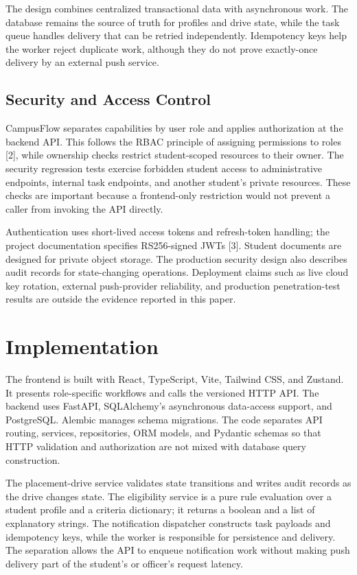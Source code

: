 \documentclass[conference,final]{IEEEtran}
\begin{document}
The design combines centralized transactional data with asynchronous work. The database remains the source of truth for profiles and drive state, while the task queue handles delivery that can be retried independently. Idempotency keys help the worker reject duplicate work, although they do not prove exactly-once delivery by an external push service.

\subsection{Security and Access Control}
CampusFlow separates capabilities by user role and applies authorization at the backend API. This follows the RBAC principle of assigning permissions to roles [2], while ownership checks restrict student-scoped resources to their owner. The security regression tests exercise forbidden student access to administrative endpoints, internal task endpoints, and another student's private resources. These checks are important because a frontend-only restriction would not prevent a caller from invoking the API directly.

Authentication uses short-lived access tokens and refresh-token handling; the project documentation specifies RS256-signed JWTs [3]. Student documents are designed for private object storage. The production security design also describes audit records for state-changing operations. Deployment claims such as live cloud key rotation, external push-provider reliability, and production penetration-test results are outside the evidence reported in this paper.

\section{Implementation}
The frontend is built with React, TypeScript, Vite, Tailwind CSS, and Zustand. It presents role-specific workflows and calls the versioned HTTP API. The backend uses FastAPI, SQLAlchemy's asynchronous data-access support, and PostgreSQL. Alembic manages schema migrations. The code separates API routing, services, repositories, ORM models, and Pydantic schemas so that HTTP validation and authorization are not mixed with database query construction.

The placement-drive service validates state transitions and writes audit records as the drive changes state. The eligibility service is a pure rule evaluation over a student profile and a criteria dictionary; it returns a boolean and a list of explanatory strings. The notification dispatcher constructs task payloads and idempotency keys, while the worker is responsible for persistence and delivery. The separation allows the API to enqueue notification work without making push delivery part of the student's or officer's request latency.
\end{document}
